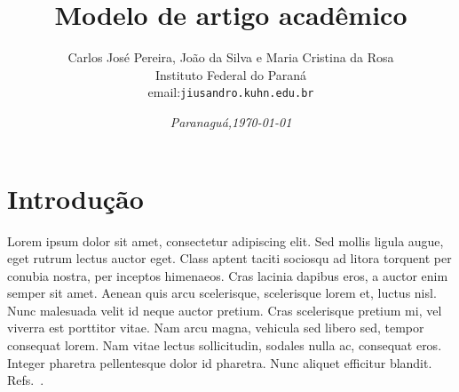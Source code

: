 \documentclass[%
a4paper, %
twocolumn, %
10pt %
]{article}
\title{\textbf{Modelo de artigo acadêmico}}
\author{Carlos José Pereira, João da Silva e Maria Cristina da Rosa\\
Instituto Federal do Paraná\\
email:\texttt{jiusandro.kuhn\@ifpr.edu.br}
}
\date{\textit{Paranaguá,\today}}
\begin{document}

\tableofcontents %


\section{Introdução}
Lorem ipsum dolor sit amet, consectetur adipiscing elit. Sed mollis ligula augue, eget rutrum lectus auctor eget. Class aptent taciti sociosqu ad litora torquent per conubia nostra, per inceptos himenaeos. Cras lacinia dapibus eros, a auctor enim semper sit amet. Aenean quis arcu scelerisque, scelerisque lorem et, luctus nisl. Nunc malesuada velit id neque auctor pretium. Cras scelerisque pretium mi, vel viverra est porttitor vitae. Nam arcu magna, vehicula sed libero sed, tempor consequat lorem. Nam vitae lectus sollicitudin, sodales nulla ac, consequat eros. Integer pharetra pellentesque dolor id pharetra. Nunc aliquet efficitur blandit. Refs.~\citep{gil2010,oliveira2011,calcada2005}.
\end{document}
